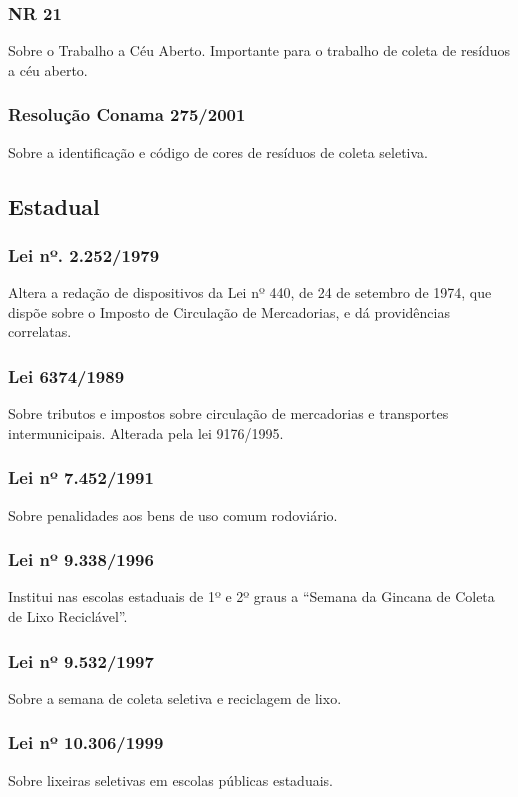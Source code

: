 \begin{subapend}
\begin{subsubapend}
		\subsubsection{NR 21}
		Sobre o Trabalho a Céu Aberto. Importante para o trabalho de coleta de resíduos a céu aberto.
		\subsubsection{Resolução Conama 275/2001}
		Sobre a identificação e código de cores de resíduos de coleta seletiva.
	\end{subsubapend}
\end{subapend}

\begin{subapend}
	\subsection{Estadual}
	\begin{subsubapend}
		\subsubsection{Lei nº. 2.252/1979}
		Altera a redação de dispositivos da Lei nº 440, de 24 de setembro de 1974, que dispõe sobre o Imposto de Circulação de Mercadorias, e dá providências correlatas.
		\subsubsection{Lei 6374/1989}
		Sobre tributos e impostos sobre circulação de mercadorias e transportes intermunicipais. Alterada pela lei 9176/1995.
		\subsubsection{Lei nº 7.452/1991}
		Sobre penalidades aos bens de uso comum rodoviário.
		\subsubsection{Lei nº 9.338/1996}
		Institui nas escolas estaduais de 1º e 2º graus a “Semana da Gincana de Coleta de Lixo Reciclável”.
		\subsubsection{Lei nº 9.532/1997}
		Sobre a semana de coleta seletiva e reciclagem de lixo.
		\subsubsection{Lei nº 10.306/1999}
		Sobre lixeiras seletivas em escolas públicas estaduais.

\end{subsubapend}
\end{subapend}
